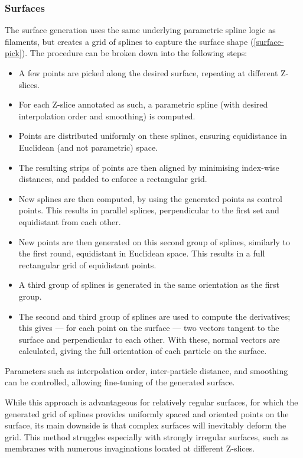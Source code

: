 \subsubsection{Surfaces}
The surface generation uses the same underlying parametric spline logic as filaments, but creates a grid of splines to capture the surface shape (\autoref{surface-pick}). The procedure can be broken down into the following steps:

\begin{itemize}[noitemsep] 
    \item A few points are picked along the desired surface, repeating at different Z-slices.
    \item For each Z-slice annotated as such, a parametric spline (with desired interpolation order and smoothing) is computed.
    \item Points are distributed uniformly on these splines, ensuring equidistance in Euclidean (and not parametric) space.
    \item The resulting strips of points are then aligned by minimising index-wise distances, and padded to enforce a rectangular grid.
    \item New splines are then computed, by using the generated points as control points. This results in parallel splines, perpendicular to the first set and equidistant from each other.
    \item New points are then generated on this second group of splines, similarly to the first round, equidistant in Euclidean space. This results in a full rectangular grid of equidistant points.
    \item A third group of splines is generated in the same orientation as the first group.
    \item The second and third group of splines are used to compute the derivatives; this gives --- for each point on the surface --- two vectors tangent to the surface and perpendicular to each other. With these, normal vectors are calculated, giving the full orientation of each particle on the surface.
\end{itemize}

Parameters such as interpolation order, inter-particle distance, and smoothing can be controlled, allowing fine-tuning of the generated surface.

While this approach is advantageous for relatively regular surfaces, for which the generated grid of splines provides uniformly spaced and oriented points on the surface, its main downside is that complex surfaces will inevitably deform the grid. This method struggles especially with strongly irregular surfaces, such as membranes with numerous invaginations located at different Z-slices.

